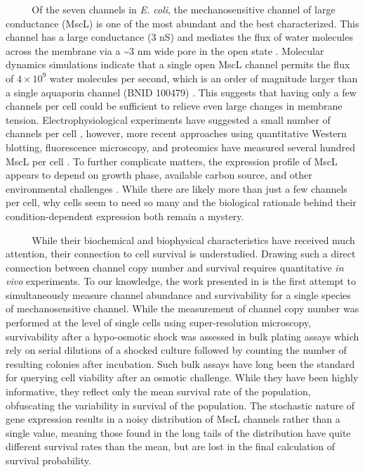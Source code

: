\documentclass[12pt]{caltech_thesis}
\begin{document}
~~ ~ ~Of the seven channels in \emph{E. coli}, the mechanosensitive
channel of large conductance (MscL) is one of the most abundant and the
best characterized. This channel has a large conductance (3 nS) and
mediates the flux of water molecules across the membrane via a
\textasciitilde3 nm wide pore in the open state
\autocite{cruickshank1997,haswell2011}. Molecular dynamics simulations
indicate that a single open MscL channel permits the flux of
\(4 \times 10^9\) water molecules per second, which is an order of
magnitude larger than a single aquaporin channel (BNID 100479)
\autocite{louhivuori2010,milo2010}. This suggests that having only a few
channels per cell could be sufficient to relieve even large changes in
membrane tension. Electrophysiological experiments have suggested a
small number of channels per cell \autocite{booth2005,hase1997},
however, more recent approaches using quantitative Western blotting,
fluorescence microscopy, and proteomics have measured several hundred
MscL per cell \autocite{bialecka-fornal2012,schmidt2016,soufi2015}. To
further complicate matters, the expression profile of MscL appears to
depend on growth phase, available carbon source, and other environmental
challenges
\autocites[\textcite{schmidt2016}]{bialecka-fornal2012}{soufi2015,stokes2003}.
While there are likely more than just a few channels per cell, why cells
seem to need so many and the biological rationale behind their
condition-dependent expression both remain a mystery.

~~~ ~ While their biochemical and biophysical characteristics have
received much attention, their connection to cell survival is
understudied. Drawing such a direct connection between channel copy
number and survival requires quantitative \emph{in vivo} experiments. To
our knowledge, the work presented in \autocite{vandenberg2016} is the
first attempt to simultaneously measure channel abundance and
survivability for a single species of mechanosensitive channel. While
the measurement of channel copy number was performed at the level of
single cells using super-resolution microscopy, survivability after a
hypo-osmotic shock was assessed in bulk plating assays which rely on
serial dilutions of a shocked culture followed by counting the number of
resulting colonies after incubation. Such bulk assays have long been the
standard for querying cell viability after an osmotic challenge. While
they have been highly informative, they reflect only the mean survival
rate of the population, obfuscating the variability in survival of the
population. The stochastic nature of gene expression results in a noisy
distribution of MscL channels rather than a single value, meaning those
found in the long tails of the distribution have quite different
survival rates than the mean, but are lost in the final calculation of
survival probability.
\end{document}

